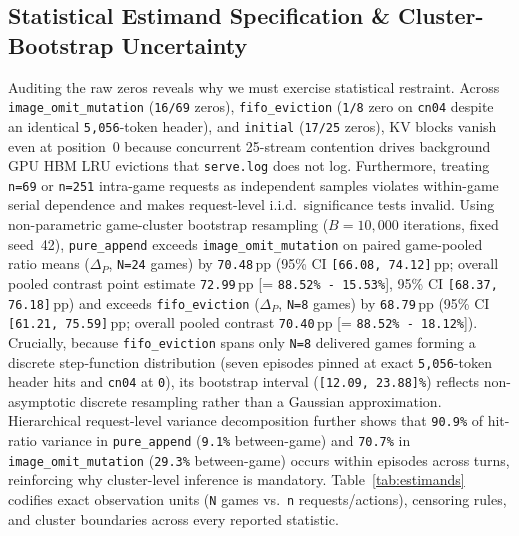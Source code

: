 \documentclass[10pt]{article}
\newcommand{\code}[1]{\texttt{#1}}
\begin{document}
\subsection{Statistical Estimand Specification \& Cluster-Bootstrap Uncertainty}
Auditing the raw zeros reveals why we must exercise statistical restraint. Across \code{image\_omit\_mutation} (\code{16/69} zeros), \code{fifo\_eviction} (\code{1/8} zero on \code{cn04} despite an identical \code{5,056}-token header), and \code{initial} (\code{17/25} zeros), KV blocks vanish even at position~0 because concurrent 25-stream contention drives background GPU HBM LRU evictions that \code{serve.log} does not log. Furthermore, treating \code{n=69} or \code{n=251} intra-game requests as independent samples violates within-game serial dependence and makes request-level i.i.d.\ significance tests invalid. Using non-parametric game-cluster bootstrap resampling ($B=10,000$ iterations, fixed seed~42), \code{pure\_append} exceeds \code{image\_omit\_mutation} on paired game-pooled ratio means ($\Delta_P$, \code{N=24} games) by \code{70.48}\,pp (95\% CI \code{[66.08, 74.12]}\,pp; overall pooled contrast point estimate \code{72.99}\,pp [= \code{88.52\% - 15.53\%}], 95\% CI \code{[68.37, 76.18]}\,pp) and exceeds \code{fifo\_eviction} ($\Delta_P$, \code{N=8} games) by \code{68.79}\,pp (95\% CI \code{[61.21, 75.59]}\,pp; overall pooled contrast \code{70.40}\,pp [= \code{88.52\% - 18.12\%}]). Crucially, because \code{fifo\_eviction} spans only \code{N=8} delivered games forming a discrete step-function distribution (seven episodes pinned at exact \code{5,056}-token header hits and \code{cn04} at \code{0}), its bootstrap interval (\code{[12.09, 23.88]\%}) reflects non-asymptotic discrete resampling rather than a Gaussian approximation. Hierarchical request-level variance decomposition further shows that \code{90.9\%} of hit-ratio variance in \code{pure\_append} (\code{9.1\%} between-game) and \code{70.7\%} in \code{image\_omit\_mutation} (\code{29.3\%} between-game) occurs within episodes across turns, reinforcing why cluster-level inference is mandatory. Table~\ref{tab:estimands} codifies exact observation units (\code{N} games vs.\ \code{n} requests/actions), censoring rules, and cluster boundaries across every reported statistic.
\end{document}
